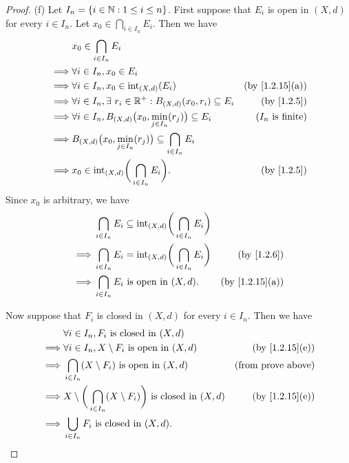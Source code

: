 \begin{proof}{(f)}
  Let \(I_n = \{i \in \mathbb{N} : 1 \leq i \leq n\}\).
  First suppose that \(E_i\) is open in \((X, d)\) for every \(i \in I_n\).
  Let \(x_0 \in \bigcap_{i \in I_n} E_i\).
  Then we have
  \begin{align*}
             & x_0 \in \bigcap_{i \in I_n} E_i                                                                                 \\
    \implies & \forall i \in I_n, x_0 \in E_i                                                                                  \\
    \implies & \forall i \in I_n, x_0 \in \text{int}_{(X, d)}(E_i)                              & \text{(by \cref{1.2.15}(a))} \\
    \implies & \forall i \in I_n, \exists\ r_i \in \R^+ : B_{(X, d)}(x_0, r_i) \subseteq E_i    & \text{(by \cref{1.2.5})}     \\
    \implies & \forall i \in I_n, B_{(X, d)}\big(x_0, \min_{j \in I_n}(r_j)\big) \subseteq E_i  & \text{(\(I_n\) is finite)}   \\
    \implies & B_{(X, d)}\big(x_0, \min_{j \in I_n}(r_j)\big) \subseteq \bigcap_{i \in I_n} E_i                                \\
    \implies & x_0 \in \text{int}_{(X, d)}\bigg(\bigcap_{i \in I_n} E_i\bigg).                  & \text{(by \cref{1.2.5})}
  \end{align*}
  Since \(x_0\) is arbitrary, we have
  \begin{align*}
             & \bigcap_{i \in I_n} E_i \subseteq \text{int}_{(X, d)}\bigg(\bigcap_{i \in I_n} E_i\bigg)                                \\
    \implies & \bigcap_{i \in I_n} E_i = \text{int}_{(X, d)}\bigg(\bigcap_{i \in I_n} E_i\bigg)         & \text{(by \cref{1.2.6})}     \\
    \implies & \bigcap_{i \in I_n} E_i \text{ is open in } (X, d).                                      & \text{(by \cref{1.2.15}(a))}
  \end{align*}

  Now suppose that \(F_i\) is closed in \((X, d)\) for every \(i \in I_n\).
  Then we have
  \begin{align*}
             & \forall i \in I_n, F_i \text{ is closed in } (X, d)                                                                       \\
    \implies & \forall i \in I_n, X \setminus F_i \text{ is open in } (X, d)                              & \text{(by \cref{1.2.15}(e))} \\
    \implies & \bigcap_{i \in I_n} (X \setminus F_i) \text{ is open in } (X, d)                           & \text{(from prove above)}    \\
    \implies & X \setminus \bigg(\bigcap_{i \in I_n} (X \setminus F_i)\bigg) \text{ is closed in } (X, d) & \text{(by \cref{1.2.15}(e))} \\
    \implies & \bigcup_{i \in I_n} F_i \text{ is closed in } (X, d).
  \end{align*}
\end{proof}

